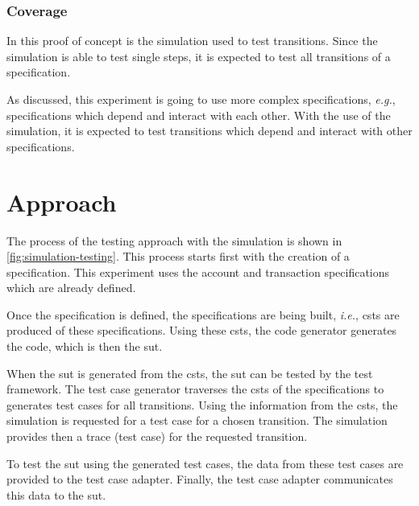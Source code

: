 \subsubsection{Coverage}
In this proof of concept is the simulation used to test transitions. Since
the simulation is able to test single steps, it is expected to test all
transitions of a specification.

As discussed, this experiment is going to use more complex specifications,
\textit{e.g.}, specifications which depend and interact with each other. With
the use of the simulation, it is expected to test transitions which depend and
interact with other specifications.

\section{Approach}

The process of the testing approach with the simulation is shown in
\autoref{fig:simulation-testing}. This process starts first with the creation of
a specification. This experiment uses the account and transaction specifications
which are already defined.

Once the specification is defined, the specifications
are being built, \textit{i.e.}, \gls{csts} are produced of
these specifications. Using these \gls{csts}, the code generator generates the code,
which is then the \gls{sut}.

When the \gls{sut} is generated from the \gls{csts}, the \gls{sut} can be tested by the test
framework. The test case generator traverses the \gls{csts} of the specifications to
generates test cases for all transitions. Using the information from the \gls{csts},
the simulation is requested for a test case for a chosen transition. The
simulation provides then a trace (test case) for the requested transition.

To test the \gls{sut} using the generated test cases, the data
from these test cases are provided to the test case adapter. Finally, the test
case adapter communicates this data to the \gls{sut}.

